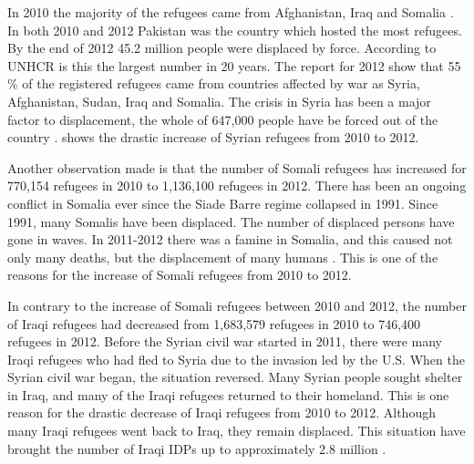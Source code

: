 In 2010 the majority of the refugees came from Afghanistan, Iraq and Somalia \cite{UNHCRstat2010}. In both 2010 and 2012 Pakistan was the country which hosted the most refugees. By the end of 2012 45.2 million people were displaced by force. According to UNHCR is this the largest number in 20 years. The report for 2012 show that 55 \% of the registered refugees came from countries affected by war as Syria, Afghanistan, Sudan, Iraq and Somalia.  The crisis in Syria has been a major factor to displacement, the whole of 647,000 people have be forced out of the country \cite{UNHCRstat2012}.  shows the drastic increase of Syrian refugees from 2010 to 2012. 

Another observation made is that the number of Somali refugees has increased for 770,154 refugees in 2010 to 1,136,100 refugees in 2012. There has been an ongoing conflict in Somalia ever since the Siade Barre regime collapsed in 1991. Since 1991, many Somalis have been displaced. The number of displaced persons have gone in waves. In 2011-2012 there was a famine in Somalia, and this caused not only many deaths, but the displacement of many humans \cite{somalia}. This is one of the reasons for the increase of Somali refugees from 2010 to 2012. 

In contrary to the increase of Somali refugees between 2010 and 2012, the number of Iraqi refugees had decreased from 1,683,579 refugees in 2010 to 746,400 refugees in 2012. Before the Syrian civil war started in 2011, there were many Iraqi refugees who had fled to Syria due to the invasion led by the U.S. When the Syrian civil war began, the situation reversed. Many Syrian people sought shelter in Iraq, and many of the Iraqi refugees returned to their homeland. This is one reason for the drastic decrease of Iraqi refugees from 2010 to 2012. Although many Iraqi refugees went back to Iraq, they remain displaced. This situation have brought the number of Iraqi IDPs up to approximately 2.8 million \citep{iraq}. 

